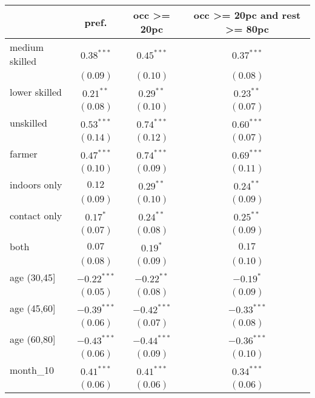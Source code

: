 
\begin{table}[h!]
\begin{center}
\begin{small}
\begin{tabular}{l c c c}
\hline
 & pref. & occ >= 20pc & occ >= 20pc and rest >= 80pc \\
\hline
medium skilled & $0.38^{***}$  & $0.45^{***}$  & $0.37^{***}$  \\
               & $(0.09)$      & $(0.10)$      & $(0.08)$      \\
lower skilled  & $0.21^{**}$   & $0.29^{**}$   & $0.23^{**}$   \\
               & $(0.08)$      & $(0.10)$      & $(0.07)$      \\
unskilled      & $0.53^{***}$  & $0.74^{***}$  & $0.60^{***}$  \\
               & $(0.14)$      & $(0.12)$      & $(0.07)$      \\
farmer         & $0.47^{***}$  & $0.74^{***}$  & $0.69^{***}$  \\
               & $(0.10)$      & $(0.09)$      & $(0.11)$      \\
indoors only   & $0.12$        & $0.29^{**}$   & $0.24^{**}$   \\
               & $(0.09)$      & $(0.10)$      & $(0.09)$      \\
contact only   & $0.17^{*}$    & $0.24^{**}$   & $0.25^{**}$   \\
               & $(0.07)$      & $(0.08)$      & $(0.09)$      \\
both           & $0.07$        & $0.19^{*}$    & $0.17$        \\
               & $(0.08)$      & $(0.09)$      & $(0.10)$      \\
age (30,45]    & $-0.22^{***}$ & $-0.22^{**}$  & $-0.19^{*}$   \\
               & $(0.05)$      & $(0.08)$      & $(0.09)$      \\
age (45,60]    & $-0.39^{***}$ & $-0.42^{***}$ & $-0.33^{***}$ \\
               & $(0.06)$      & $(0.07)$      & $(0.08)$      \\
age (60,80]    & $-0.43^{***}$ & $-0.44^{***}$ & $-0.36^{***}$ \\
               & $(0.06)$      & $(0.09)$      & $(0.10)$      \\
month\_10      & $0.41^{***}$  & $0.41^{***}$  & $0.34^{***}$  \\
               & $(0.06)$      & $(0.06)$      & $(0.06)$      \\

\end{tabular}
\end{small}
\end{center}
\end{table}
